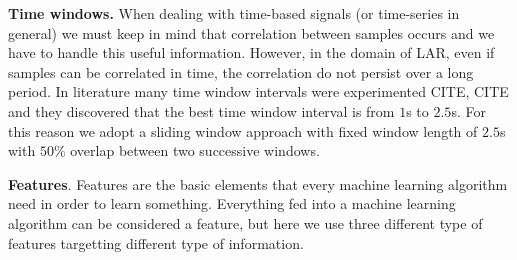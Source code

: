\textbf{Time windows.} When dealing with time-based signals (or
time-series in general) we must keep in mind that correlation between
samples occurs and we have to handle this useful information. However,
in the domain of LAR, even if samples can be correlated in time, the
correlation do not persist over a long period. In literature many time
window intervals were experimented CITE, CITE and they discovered that
the best time window interval is from $1$s to $2.5$s. For this reason
we adopt a sliding window approach with fixed window length of $2.5$s
with $50$\% overlap between two successive windows.

\textbf{Features}. Features are the basic elements that every machine
learning algorithm need in order to learn something. Everything fed
into a machine learning algorithm can be considered a feature, but
here we use three different type of features targetting different type
of information.

